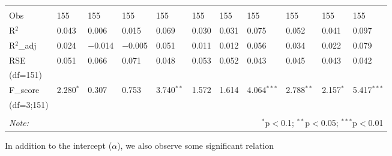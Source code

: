 \begin{table}[H]
\begin{tabularx}{\textwidth}{XXXXXXXXXXl}
  & & & & & & & & & & \\ 
\hline \\[-1.8ex] 
Obs & 155 & 155 & 155 & 155 & 155 & 155 & 155 & 155 & 155 & 155 \\ 
R$^{2}$ & 0.043 & 0.006 & 0.015 & 0.069 & 0.030 & 0.031 & 0.075 & 0.052 & 0.041 & 0.097 \\ 
R$^{2}$_{adj} & 0.024 & $-$0.014 & $-$0.005 & 0.051 & 0.011 & 0.012 & 0.056 & 0.034 & 0.022 & 0.079 \\ 
RSE & 0.051 & 0.066 & 0.071 & 0.048 & 0.053 & 0.052 & 0.043 & 0.045 & 0.043 & 0.042 \\ 
(df=151) & & & & & & & & & & \\
F_{score} & 2.280$^{*}$ & 0.307 & 0.753 & 3.740$^{**}$ & 1.572 & 1.614 & 4.064$^{***}$ & 2.788$^{**}$ & 2.157$^{*}$ & 5.417$^{***}$ \\ 
(df=3;151) & & & & & & & & & & \\
\hline 
\hline \\[-1.8ex] 
\textit{Note:}  & \multicolumn{10}{r}{$^{*}$p$<$0.1; $^{**}$p$<$0.05; $^{***}$p$<$0.01} \\ 
\end{tabularx} 
\end{table} 

In addition to the intercept ($\alpha$), we also observe some significant relation

